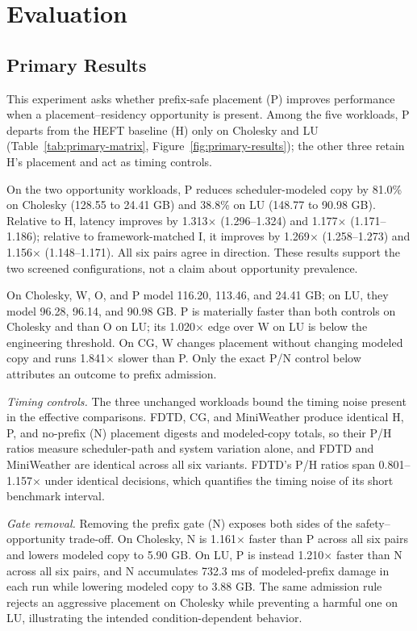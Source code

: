\documentclass[sigconf]{acmart}
\begin{document}
\section{Evaluation}\label{sec:evaluation}

\subsection{Primary Results}\label{sec:primary-results}

This experiment asks whether prefix-safe placement (P) improves performance when a placement--residency opportunity is present. Among the five workloads, P departs from the HEFT baseline (H) only on Cholesky and LU (Table~\ref{tab:primary-matrix}, Figure~\ref{fig:primary-results}); the other three retain H's placement and act as timing controls.

On the two opportunity workloads, P reduces scheduler-modeled copy by 81.0\% on Cholesky (128.55 to 24.41 GB) and 38.8\% on LU (148.77 to 90.98 GB). Relative to H, latency improves by 1.313\(\times\) (1.296--1.324) and 1.177\(\times\) (1.171--1.186); relative to framework-matched I, it improves by 1.269\(\times\) (1.258--1.273) and 1.156\(\times\) (1.148--1.171). All six pairs agree in direction. These results support the two screened configurations, not a claim about opportunity prevalence.

On Cholesky, W, O, and P model 116.20, 113.46, and 24.41 GB; on LU, they model 96.28, 96.14, and 90.98 GB. P is materially faster than both controls on Cholesky and than O on LU; its 1.020\(\times\) edge over W on LU is below the engineering threshold. On CG, W changes placement without changing modeled copy and runs 1.841\(\times\) slower than P. Only the exact P/N control below attributes an outcome to prefix admission.

\emph{Timing controls.} The three unchanged workloads bound the timing noise present in the effective comparisons. FDTD, CG, and MiniWeather produce identical H, P, and no-prefix (N) placement digests and modeled-copy totals, so their P/H ratios measure scheduler-path and system variation alone, and FDTD and MiniWeather are identical across all six variants. FDTD's P/H ratios span 0.801--1.157\(\times\) under identical decisions, which quantifies the timing noise of its short benchmark interval.

\emph{Gate removal.} Removing the prefix gate (N) exposes both sides of the safety--opportunity trade-off. On Cholesky, N is 1.161\(\times\) faster than P across all six pairs and lowers modeled copy to 5.90 GB. On LU, P is instead 1.210\(\times\) faster than N across all six pairs, and N accumulates 732.3 ms of modeled-prefix damage in each run while lowering modeled copy to 3.88 GB. The same admission rule rejects an aggressive placement on Cholesky while preventing a harmful one on LU, illustrating the intended condition-dependent behavior.
\end{document}
